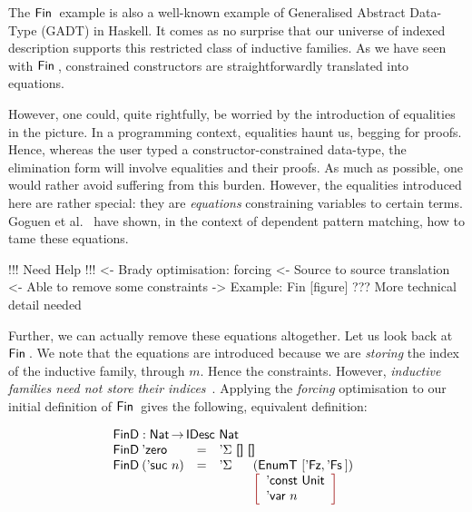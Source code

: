 The $\Fin$ example is also a well-known example of Generalised
Abstract Data-Type (GADT) in Haskell. It comes as no surprise that our
universe of indexed description supports this restricted class of
inductive families. As we have seen with $\Fin$, constrained
constructors are straightforwardly translated into equations.

However, one could, quite rightfully, be worried by the introduction
of equalities in the picture. In a programming context, equalities
haunt us, begging for proofs. Hence, whereas the user typed a
constructor-constrained data-type, the elimination form will involve
equalities and their proofs. As much as possible, one would rather
avoid suffering from this burden. However, the equalities introduced
here are rather special: they are \emph{equations} constraining
variables to certain terms. Goguen et
al.~\cite{goguen:pattern-matching} have shown, in the context of
dependent pattern matching, how to tame these equations. 

\begin{wstructure}
!!! Need Help !!!
<- Brady optimisation: forcing
    <- Source to source translation
    <- Able to remove some constraints
    -> Example: Fin [figure]
    ??? More technical detail needed
\end{wstructure}

Further, we can actually remove these equations altogether. Let us
look back at $\Fin$. We note that the equations are introduced because
we are \emph{storing} the index of the inductive family, through
$m$. Hence the constraints. However, \emph{inductive families need not
  store their indices}~\cite{brady:index-inductive-families}. Applying
the \emph{forcing} optimisation to our initial definition of $\Fin$
gives the following, equivalent definition:

\[\stk{
\FinD : \Nat \To \IDesc{\Nat} \\
\begin{array}{@{}llll}
\FinD\: \NatZero     & = & \multicolumn{2}{l}{\DSigma{\Void}{\Void} } \\
\FinD\: (\NatSuc{n}) & = & \DSigma{}{} & (\EnumT{[ \FinZero , \FinSuc{} ]}) \\
                     &   &             & \bigRedBracket{
                                         \begin{array}{l}
                                         \DConst{\Unit} \\
                                         \DVar{n}
                                         \end{array}
                                         }
\end{array}
}\]

